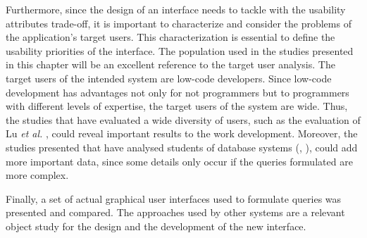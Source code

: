 Furthermore, since the design of an interface needs to tackle with the usability attributes trade-off, it is important to characterize and consider the problems of the application's target users. This characterization is essential to define the usability priorities of the interface. The population used in the studies presented in this chapter will be an excellent reference to the target user analysis. The target users of the intended system are low-code developers. Since low-code development has advantages not only for not programmers but to programmers with different levels of expertise, the target users of the system are wide. Thus, the studies that have evaluated a wide diversity of users, such as the evaluation of Lu \textit{et al.} \cite{aSurveyOnUsageOfSQL}, could reveal important results to the work development. Moreover, the studies presented that have analysed students of database systems (\cite{studentsSemanticMistakesInWritingSevenDifferentTypesOfSQLQueries}, \cite{errorsAndComplicationsInSQLQueryFormulation}), could add more important data, since some details only occur if the queries formulated are more complex.

Finally, a set of actual graphical user interfaces used to formulate queries was presented and compared. The approaches used by other systems are a relevant object study for the design and the development of the new interface. %

